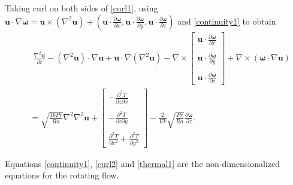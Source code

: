 \documentclass[12pt, a4paper]{article}
\begin{document}
Taking curl on both sides of \eqref{curl1}, using $\bm{u}\cdot\nabla\bm{\omega} = \textbf{u}\times(\nabla^2\bm{u})+\left(\bm{u}\cdot\frac{\partial\bm{\omega}}{\partial x}, \bm{u}\cdot\frac{\partial\bm{\omega}}{\partial y}, \bm{u}\cdot\frac{\partial\bm{\omega}}{\partial z}\right)$ and \eqref{continuity1} to obtain
\begin{align}\label{curl2}
\nonumber&~~~\frac{\nabla^2\bm{u}}{\partial t}-(\nabla^2\bm{u})\cdot\nabla\bm{u}+\bm{u}\cdot\nabla(\nabla^2\bm{u})-\nabla\times\begin{bmatrix}\bm{u}\cdot\frac{\partial\bm{\omega}}{\partial x}\\\\\bm{u}\cdot\frac{\partial\bm{\omega}}{\partial y}\\\\\bm{u}\cdot\frac{\partial\bm{\omega}}{\partial z}\end{bmatrix}+\nabla\times(\bm{\omega}\cdot\nabla\bm{u})
\\&~=\sqrt{\frac{16Pr}{Ra}}\nabla^2\nabla^2\bm{u}+\begin{bmatrix}-\frac{\partial^2T}{\partial z\partial x}\\\\-\frac{\partial^2T}{\partial z\partial y}\\\\\frac{\partial^2T}{\partial x^2}+\frac{\partial^2T}{\partial y^2}\end{bmatrix}-\frac{2}{Ek}\sqrt{\frac{Pr}{Ra}}\frac{\partial\bm{\omega}}{\partial z}.
\end{align}


Equations \eqref{continuity1}, \eqref{curl2} and \eqref{thermal1} are the non-dimensionalized equations for the rotating flow.



\end{document}
